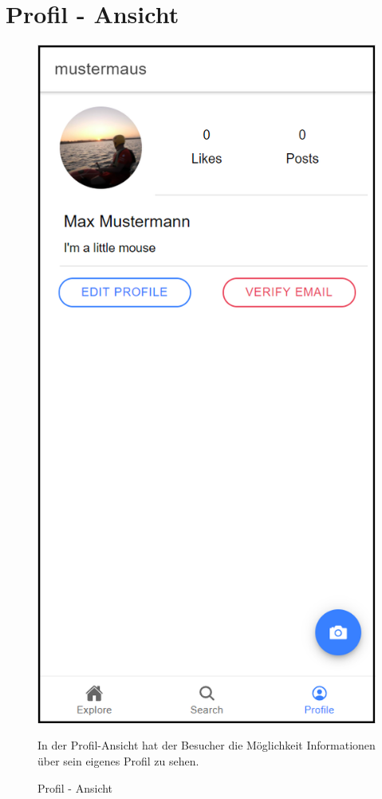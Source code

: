 \section{Profil - Ansicht\label{sec4.2:Unterpunkt-2}}

\begin{figure}[H]
    \centering
    \begin{minipage}{.4\textwidth}
        \begin{center}
            \includegraphics[width=0.8\linewidth]{images/profil.png}
        \end{center}
        \caption{Profil - Ansicht}
        \label{fig:profil}
    \end{minipage}%
    \begin{minipage}{.6\textwidth}
        \begin{changemargin}{0.5cm}{0cm}            
            In der Profil-Ansicht hat der Besucher die Möglichkeit Informationen über sein eigenes Profil zu sehen.


\end{changemargin}
\end{minipage}
\end{figure}
